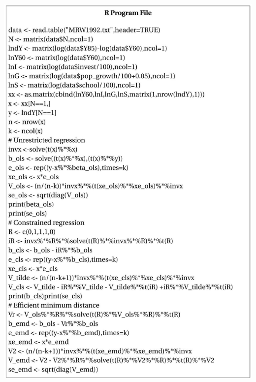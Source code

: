 \documentclass[10pt]{article}
\begin{document}
\includegraphics[max width=\textwidth]{2022_09_17_fb390717b501da243396g-16}
\end{document}
